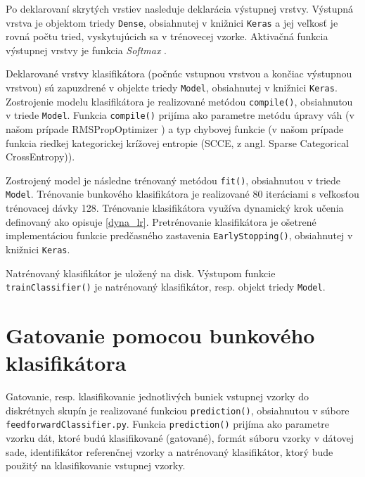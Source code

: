 Po deklarovaní skrytých vrstiev nasleduje deklarácia výstupnej vrstvy. Výstupná vrstva je objektom triedy \texttt{Dense}, obsiahnutej v knižnici \texttt{Keras} a jej veľkosť je rovná počtu tried, vyskytujúcich sa v trénovecej vzorke. Aktivačná funkcia výstupnej vrstvy je funkcia \textit{Softmax} \cite{Goh1995}.

Deklarované vrstvy klasifikátora (počnúc vstupnou vrstvou a končiac výstupnou vrstvou) sú zapuzdrené v objekte triedy \texttt{Model}, obsiahnutej v knižnici \texttt{Keras}. Zostrojenie modelu klasifikátora je realizované metódou \texttt{compile()}, obsiahnutou v triede \texttt{Model}. Funkcia \texttt{compile()} prijíma ako parametre metódu úpravy váh (v našom prípade RMSPropOptimizer \cite{Goh1995}) a typ chybovej funkcie (v našom prípade funkcia riedkej kategorickej krížovej entropie (SCCE, z angl. Sparse Categorical CrossEntropy)).

Zostrojený model je následne trénovaný metódou \texttt{fit()}, obsiahnutou v triede \texttt{Model}. Trénovanie bunkového klasifikátora je realizované 80 iteráciami s veľkosťou trénovacej dávky 128. Trénovanie klasifikátora využíva dynamický krok učenia definovaný ako opisuje \ref{dyna_lr}. Pretrénovanie klasifikátora je ošetrené implementáciou funkcie predčasného zastavenia \texttt{EarlyStopping()}, obsiahnutej v knižnici \texttt{Keras}.

Natrénovaný klasifikátor je uložený na disk. Výstupom funkcie \texttt{trainClassifier()} je natrénovaný klasifikátor, resp. objekt triedy \texttt{Model}.

\section{Gatovanie pomocou bunkového klasifikátora}
\label{gateFF}

Gatovanie, resp. klasifikovanie jednotlivých buniek vstupnej vzorky do diskrétnych skupín je realizované funkciou \texttt{prediction()}, obsiahnutou v súbore \texttt{feedforwardClassifier.py}. Funkcia \texttt{prediction()} prijíma ako parametre vzorku dát, ktoré budú klasifikované (gatované), formát súboru vzorky v dátovej sade, identifikátor referenčnej vzorky a natrénovaný klasifikátor, ktorý bude použitý na klasifikovanie vstupnej vzorky.

